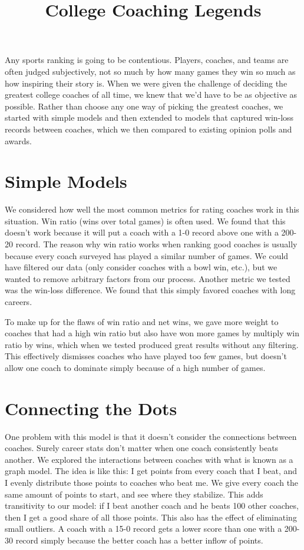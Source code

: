 \documentclass[12pt]{article}
\begin{document}
\title{College Coaching Legends}
\date{}
\maketitle
\vspace{-10ex}
Any sports ranking is going to be contentious. Players, coaches, and teams are often judged subjectively, not so much by how many games they win so much as how inspiring their story is. When we were given the challenge of deciding the greatest college coaches of all time, we knew that we'd have to be as objective as possible. Rather than choose any one way of picking the greatest coaches, we started with simple models and then extended to models that captured win-loss records between coaches, which we then compared to existing opinion polls and awards.

\section{Simple Models}
We considered how well the most common metrics for rating coaches work in this situation. Win ratio (wins over total games) is often used. We found that this doesn't work because it will put a coach with a 1-0 record above one with a 200-20 record. The reason why win ratio works when ranking good coaches is usually because every coach surveyed has played a similar number of games. We could have filtered our data (only consider coaches with a bowl win, etc.), but we wanted to remove arbitrary factors from our process. Another metric we tested was the win-loss difference. We found that this simply favored coaches with long careers.

To make up for the flaws of win ratio and net wins, we gave more weight to coaches that had a high win ratio but also have won more games by multiply win ratio by wins, which when we tested produced great results without any filtering. This effectively dismisses coaches who have played too few games, but doesn't allow one coach to dominate simply because of a high number of games.

\section{Connecting the Dots}
One problem with this model is that it doesn't consider the connections between coaches. Surely career stats don't matter when one coach consistently beats another. We explored the interactions between coaches with what is known as a graph model. The idea is like this: I get points from every coach that I beat, and I evenly distribute those points to coaches who beat me. We give every coach the same amount of points to start, and see where they stabilize. This adds transitivity to our model: if I beat another coach and he beats 100 other coaches, then I get a good share of all those points. This also has the effect of eliminating small outliers. A coach with a 15-0 record gets a lower score than one with a 200-30 record simply because the better coach has a better inflow of points.
\end{document}
